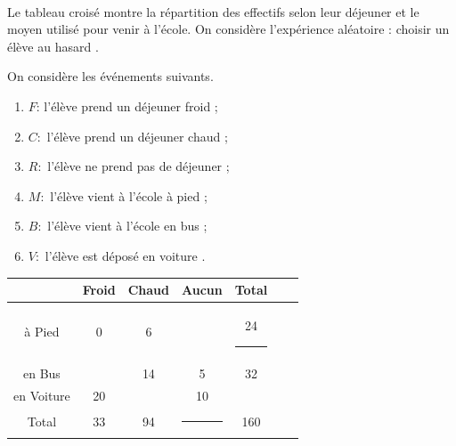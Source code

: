 \documentclass[main.tex]{subfiles}
\begin{document}
\begin{exercise}\hfill \\
	 Le tableau croisé montre la répartition des effectifs selon leur déjeuner et le moyen utilisé pour venir à l'école. On considère l'expérience aléatoire : \og choisir un élève au hasard \fg.
	
	\noindent\parbox{0.45\linewidth}{
		On considère les événements suivants.
		\begin{enumerate}[leftmargin=*,label=\textbullet]
			\item $F$: \og l'élève prend un déjeuner froid \fg;
			\item $C:$ \og l'élève prend un déjeuner chaud \fg; 
			\item $R:$ \og l'élève ne prend pas de déjeuner   \fg; 
			\item $M:$ \og l'élève vient à l'école à pied \fg;
			\item $B:$ \og l'élève vient à l'école en bus \fg;
			\item $V:$ \og l'élève est déposé en voiture \fg.
		\end{enumerate}
	}\hfill 
	\parbox{0.50\linewidth}{
		\renewcommand{\arraystretch}{1.5} 
		\begin{tabular}{|c|c|c|c|c|c|c|}
			\hline
			& Froid & Chaud & Aucun & Total \\\hline
			à Pied & 0 & 6 &  & 24\rule{1.8em}{0pt} \\\hline
			en Bus &  & 14 & 5 & 32 \\\hline
			en Voiture & 20 &  & 10 &   \\\hline
			Total &33  &94  &  \rule{1.8em}{0pt}& 160\\\hline
		\end{tabular}
	}


\end{exercise}
\end{document}
